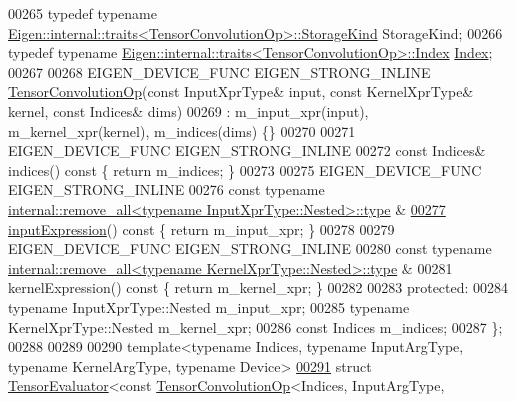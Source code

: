 \begin{DoxyCode}
00265   \textcolor{keyword}{typedef} \textcolor{keyword}{typename} \hyperlink{struct_eigen_1_1internal_1_1traits}{Eigen::internal::traits<TensorConvolutionOp>::StorageKind}
       StorageKind;
00266   \textcolor{keyword}{typedef} \textcolor{keyword}{typename} \hyperlink{struct_eigen_1_1internal_1_1traits}{Eigen::internal::traits<TensorConvolutionOp>::Index}
       \hyperlink{namespace_eigen_a62e77e0933482dafde8fe197d9a2cfde}{Index};
00267 
00268   EIGEN\_DEVICE\_FUNC EIGEN\_STRONG\_INLINE \hyperlink{class_eigen_1_1_tensor_convolution_op}{TensorConvolutionOp}(\textcolor{keyword}{const} InputXprType& input, \textcolor{keyword}{
      const} KernelXprType& kernel, \textcolor{keyword}{const} Indices& dims)
00269       : m\_input\_xpr(input), m\_kernel\_xpr(kernel), m\_indices(dims) \{\}
00270 
00271     EIGEN\_DEVICE\_FUNC EIGEN\_STRONG\_INLINE
00272     \textcolor{keyword}{const} Indices& indices()\textcolor{keyword}{ const }\{ \textcolor{keywordflow}{return} m\_indices; \}
00273 
00275     EIGEN\_DEVICE\_FUNC EIGEN\_STRONG\_INLINE
00276     \textcolor{keyword}{const} \textcolor{keyword}{typename} \hyperlink{group___sparse_core___module}{internal::remove\_all<typename InputXprType::Nested>::type}
      &
\hyperlink{class_eigen_1_1_tensor_convolution_op_a57097fbe6e0a033d587e98654f0bd664}{00277}     \hyperlink{class_eigen_1_1_tensor_convolution_op_a57097fbe6e0a033d587e98654f0bd664}{inputExpression}()\textcolor{keyword}{ const }\{ \textcolor{keywordflow}{return} m\_input\_xpr; \}
00278 
00279     EIGEN\_DEVICE\_FUNC EIGEN\_STRONG\_INLINE
00280     \textcolor{keyword}{const} \textcolor{keyword}{typename} \hyperlink{group___sparse_core___module}{internal::remove\_all<typename KernelXprType::Nested>::type}
      &
00281     kernelExpression()\textcolor{keyword}{ const }\{ \textcolor{keywordflow}{return} m\_kernel\_xpr; \}
00282 
00283   \textcolor{keyword}{protected}:
00284     \textcolor{keyword}{typename} InputXprType::Nested m\_input\_xpr;
00285     \textcolor{keyword}{typename} KernelXprType::Nested m\_kernel\_xpr;
00286     \textcolor{keyword}{const} Indices m\_indices;
00287 \};
00288 
00289 
00290 \textcolor{keyword}{template}<\textcolor{keyword}{typename} Indices, \textcolor{keyword}{typename} InputArgType, \textcolor{keyword}{typename} KernelArgType, \textcolor{keyword}{typename} Device>
\hyperlink{struct_eigen_1_1_tensor_evaluator_3_01const_01_tensor_convolution_op_3_01_indices_00_01_input_ar27ed28dccb4630db304c3ad822c3d857}{00291} \textcolor{keyword}{struct }\hyperlink{struct_eigen_1_1_tensor_evaluator}{TensorEvaluator}<const \hyperlink{class_eigen_1_1_tensor_convolution_op}{TensorConvolutionOp}<Indices, InputArgType, 

\end{DoxyCode}
